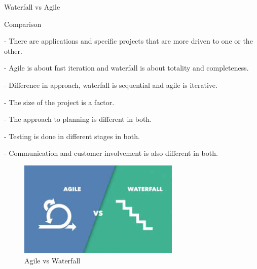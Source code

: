 \begin{frame}{Waterfall vs Agile}
    \begin{block}{Comparison}
    
        - There are applications and specific projects that are more driven to one or the other.

        - Agile is about fast iteration and waterfall is about totality and completeness.
    
        - Difference in approach, waterfall is sequential and agile is iterative.
    
        - The size of the project is a factor.
        
        - The approach to planning is different in both.

        - Testing is done in different stages in both.
    
        - Communication and customer involvement is also different in both.
    
    \end{block}

    \begin{figure}
        \centering
        \includegraphics[scale=0.2]{images/illustrate/agilevscascade.png}
        \caption{Agile vs Waterfall}
        \end{figure}

\end{frame}
